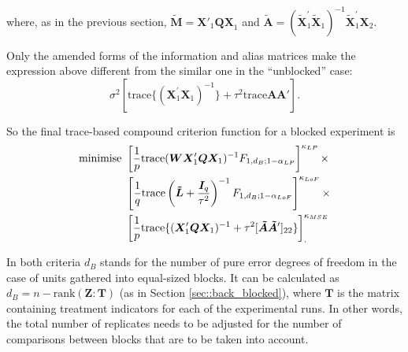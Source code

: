 where, as in the previous section, $\bm{\tilde{M}}=\bm{X}'_{1}\bm{QX}_{1}$ and $\bm{\tilde{A}}=(\bm{\tilde{X}}_1^{'}\bm{\tilde{X}}_1)^{-1}\bm{\tilde{X}}_1^{'}\bm{X}_2$. 

Only the amended forms of the information and alias matrices make the expression above different from the similar one in the ``unblocked'' case:
\begin{equation*}
\sigma^2[\mbox{trace}\{(\bm{X}_1^{'}\bm{X}_1)^{-1}\}+\tau^2\mbox{trace}\bm{A}\bm{A}'].
\end{equation*}

So the final trace-based compound criterion function for a blocked experiment is
\begin{align}
\label{eq::MSE_L_B}
\mbox{minimise }&\left[\frac{1}{p}\mbox{trace}(\bm{WX}'_{1}\bm{Q}\bm{X}_{1})^{-1}F_{1,d_B;1-\alpha_{LP}}\right]^{\kappa_{LP}}\times \notag \\&\left[\frac{1}{q}\mbox{trace}\left(\bm{\tilde{L}}+\frac{\bm{I}_{q}}{\tau^{2}}\right)^{-1}F_{1,d_B;1-\alpha_{LoF}}\right]^{\kappa_{LoF}}\times \notag \\& \left[\frac{1}{p}\mbox{trace}\{(\bm{X}'_{1}\bm{QX}_{1})^{-1}+\tau^2[\bm{\tilde{A}}\bm{\tilde{A}}']_{22}\}\right]^{\kappa_{MSE}}_{.}
\end{align}

In both criteria $d_B$ stands for the number of pure error degrees of freedom in the case of units gathered into equal-sized blocks. It can be calculated as $d_B=n-\mbox{rank}(\bm{Z}:\bm{T})$ (as in Section \ref{sec::back_blocked}), where $\bm{T}$ is the matrix containing treatment indicators for each of the experimental runs. In other words, the total number of replicates needs to be adjusted for the number of comparisons between blocks that are to be taken into account.